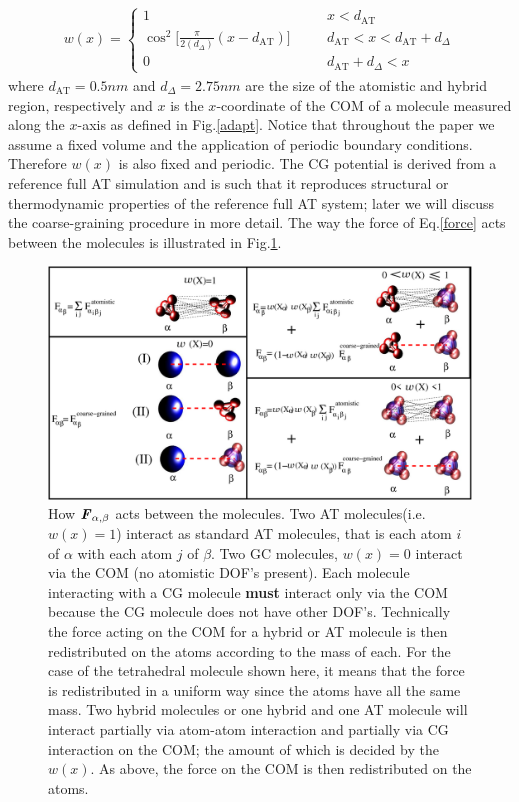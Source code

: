 \documentclass[aps,pre,preprint]{revtex4}
\newcommand{\redc}[1]{{\color{red} #1}}
\renewcommand{\v}[1]{\textbf{\textit{#1}}}
\begin{document}
\begin{align}\label{eqn:old-w}
  w(x) =
  \left\{
    \begin{array}{lcl}
      1 &\quad& x < d_{\textrm{AT}}\\
      \cos^2\big[\frac{\pi}{2(d_{{\Delta}})} (x - d_{\textrm{AT}})\big] && d_{\textrm{AT}}  < x < d_{\textrm{AT}} + d_{{\Delta}} \\
      0 && d_{\textrm{AT}} + d_{{\Delta}}  < x
    \end{array}
  \right.
\end{align}
where $d_{\textrm{AT}}=0.5 nm$ and $d_{{\Delta}}=2.75 nm$ are the size of the
atomistic and hybrid region, respectively and $x$ is the $x$-coordinate of the COM of a molecule measured along the $x$-axis as defined in Fig.\ref{adapt}. \redc{Notice that throughout the paper we assume a fixed volume and the application of periodic boundary conditions. Therefore $w(x)$ is also fixed and periodic.}
The CG potential is derived from a reference full AT simulation and is such that it reproduces structural or thermodynamic properties of the reference full AT system; later we will discuss the coarse-graining procedure in more detail. The way the force of Eq.\ref{force} acts between the molecules is illustrated in Fig.\ref{inter}. 
\begin{figure}
  \centering
  \includegraphics[angle=0,width=17cm]{force.eps}
  \caption{How ${\v F}_{\alpha,\beta}$ acts between the molecules. Two AT molecules(i.e. $w(x)=1$)  interact as standard AT molecules, that is each atom $i$ of $\alpha$ with each atom $j$ of $\beta$. Two GC molecules, $w(x)=0$ interact via the COM (no atomistic DOF's present). Each molecule interacting with a CG molecule {\bf must} interact only via the COM because the CG molecule does not have other DOF's. Technically the force acting on the COM for a hybrid or AT molecule is then redistributed on the atoms according to the mass of each. For the case of the tetrahedral molecule shown here, it means that the force is redistributed in a uniform way since the atoms have all the same mass. Two hybrid molecules or one hybrid and one AT molecule will interact partially via atom-atom interaction and partially via CG interaction on the COM; the amount of which is decided by the $w(x)$. As above, the force on the COM is then redistributed on the atoms.}
  \label{inter}
\end{figure} 
\end{document}
